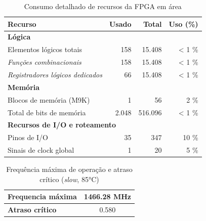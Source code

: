 \documentclass[12pt, fleqn]{article}
\begin{document}
\begin{table}[htbp]
    \centering
    \label{tab:recursos_detalhado}
    \begin{tabular}{l r r r}
        \toprule
        \textbf{Recurso} & \textbf{Usado} & \textbf{Total} & \textbf{Uso (\%)} \\
        \midrule
        \multicolumn{4}{l}{\textbf{Lógica}} \\
        \hspace{1em}\hspace{0.5em}Elementos lógicos totais           & 158   & 15.408  & < 1 \% \\
        \hspace{2em}\hspace{0.5em}\textit{Funções combinacionais}          & 158   & 15.408  & < 1 \% \\
        \hspace{2em}\hspace{0.5em}\textit{Registradores lógicos dedicados} & 66    & 15.408  & < 1 \% \\
        \midrule
        \multicolumn{4}{l}{\textbf{Memória}} \\
        \hspace{1em}\hspace{0.5em}Blocos de memória (M9K)             & 1     & 56      & 2 \%   \\
        \hspace{1em}\hspace{0.5em}Total de bits de memória            & 2.048 & 516.096 & < 1 \% \\
        \midrule
        \multicolumn{4}{l}{\textbf{Recursos de I/O e roteamento}} \\
        \hspace{1em}\hspace{0.5em}Pinos de I/O                        & 35    & 347     & 10 \%  \\
        \hspace{1em}\hspace{0.5em}Sinais de clock global              & 1     & 20      & 5 \%   \\
        \bottomrule
    \end{tabular}
    \caption{Consumo detalhado de recursos da FPGA em área}
\end{table}

\begin{table}[H]
    \centering
    \begin{tabular}{|l | c|}
        \hline
        \textbf{Frequencia máxima} & 1466.28 MHz \\
        \hline
        \textbf{Atraso crítico} & 0.580 \\
        \hline
    \end{tabular}
    \caption{Frequência máxima de operação e atraso crítico (\textit{slow}, 85°C)}
\end{table}
\end{document}
